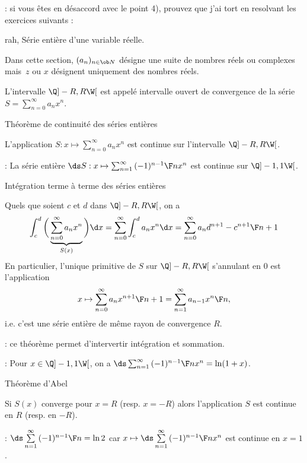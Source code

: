 \Remarque : si vous êtes en désaccord avec le point 4), prouvez que j'ai tort en resolvant les exercices suivants : 

%

%

%

%


\Subsection rah, Série entière d'une variable réelle. 

Dans cette section, $(a_n)_{n\in\ob N}$ désigne une suite de nombres réels ou complexes 
mais~$z$ ou $x$ désignent uniquement des nombres réels. 
\bigskip

\Definition [$\sum_{n=0}^\infty a_nx^n$ de rayon de convergence~$R>0$] 
L'intervalle $\Q]-R,R\W[$ est appelé intervalle ouvert de convergence de la série $S=\sum_{n=0}^\infty a_nx^n$. 

\Concept Théorème de continuité des séries entières

\Theoreme [$\sum_{n=0}^\infty a_n x^n$ de rayon de convergence $R>0$ ou~${R=\infty}$] 
L'application $S:x\mapsto\sum_{n=0}^\infty a_nx^n$ est continue sur l'intervalle $\Q]-R,R\W[$. 

\Application : La série entière $\ds S:x\mapsto\sum_{n=1}^{\infty}{(-1)^{n-1}\F n}x^n$ est continue sur $\Q]-1,1\W[$. 

\Concept Intégration terme à terme des séries entières

\Theoreme [$S=$ de rayon de convergence $R>0$ ou~$R=\infty$] 
Quels que soient $c$ et $d$ dans $\Q]-R,R\W[$, on a 
$$
\int_c^d\bigg(\underbrace{\sum\limits_{n=0}^\infty a_n x^n}_{S(x)}\bigg)\d x=\sum\limits_{n=0}^\infty\int_c^da_n x^n\d x=\sum\limits_{n=0}^\infty a_n{d^{n+1}-c^{n+1}\F n+1}
$$
En particulier, l'unique primitive de $S$ sur $\Q]-R,R\W[$ s'annulant en $0$ est l'application 
$$
x\mapsto\sum_{n=0}^\infty a_n{x^{n+1}\F n+1}=\sum_{n=1}^\infty a_{n-1}{x^n\F n}, 
$$
i.e. c'est une série entière de même rayon de convergence $R$. 

\Remarque : ce théorème permet d'intervertir intégration et sommation. 

\Application : Pour $x\in\Q]-1,1\W[$, on a $\ds \sum_{n=1}^\infty{(-1)^{n-1}\F n}x^n=\ln(1+x)$. 

\Concept Théorème d'Abel

\Theoreme [$S=\sum_{n=0}^\infty a_n x^n$ de rayon de convergence $R>0$] 
Si $S(x)$ converge pour $x=R$ (resp. $x=-R$) alors l'application $S$ est continue en $R$ (resp. en $-R$). 

\Application : $\ds\sum\limits_{n=1}^{\infty}{(-1)^{n-1}\F n}=\ln 2$ car $x\mapsto\ds \sum\limits_{n=1}^\infty{(-1)^{n-1}\F n}x^n$ est continue en $x=1$. 

